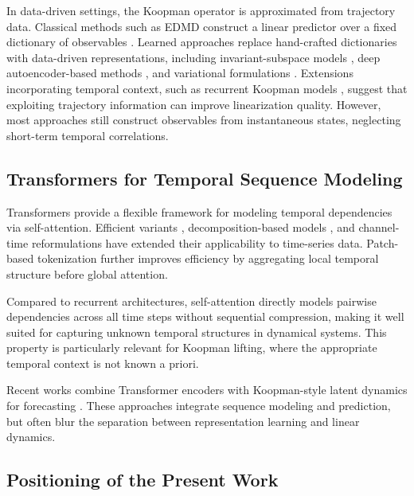 \documentclass[journal]{IEEEtran}
\begin{document}
In data-driven settings, the Koopman operator is approximated from trajectory data. Classical methods such as EDMD construct a linear predictor over a fixed dictionary of observables \cite{williams2015data, williams2015kernel, klus2018data}. Learned approaches replace hand-crafted dictionaries with data-driven representations, including invariant-subspace models \cite{takeishi2017koopman}, deep autoencoder-based methods \cite{lusch2018deep, yeung2019learning}, and variational formulations \cite{morton2019deep, yuan2022variational}. Extensions incorporating temporal context, such as recurrent Koopman models \cite{otto2019linearly, rank2019recurrent}, suggest that exploiting trajectory information can improve linearization quality. However, most approaches still construct observables from instantaneous states, neglecting short-term temporal correlations.

\subsection{Transformers for Temporal Sequence Modeling}

Transformers \cite{vaswani2017attention} provide a flexible framework for modeling temporal dependencies via self-attention. Efficient variants \cite{zhou2021informer, wang2020linformer, katharopoulos2020transformers, choromanski2021performer}, decomposition-based models \cite{wu2021autoformer, zhou2022fedformer}, and channel-time reformulations \cite{zeng2023transformers, liu2024itransformer} have extended their applicability to time-series data. Patch-based tokenization \cite{nie2023time} further improves efficiency by aggregating local temporal structure before global attention.

Compared to recurrent architectures, self-attention directly models pairwise dependencies across all time steps without sequential compression, making it well suited for capturing unknown temporal structures in dynamical systems. This property is particularly relevant for Koopman lifting, where the appropriate temporal context is not known a priori.

Recent works combine Transformer encoders with Koopman-style latent dynamics for forecasting \cite{forootani2026deepkoopformer, forootani2026spectral}. These approaches integrate sequence modeling and prediction, but often blur the separation between representation learning and linear dynamics.

\subsection{Positioning of the Present Work}
\label{subsec:positioning}
\end{document}
